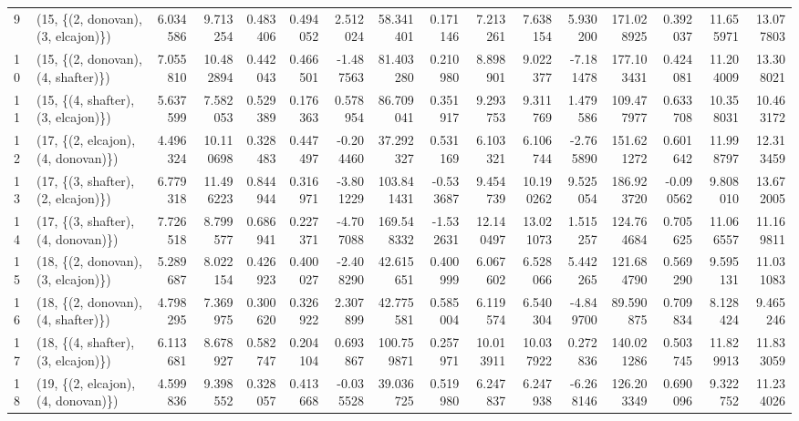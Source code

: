 \begin{tabular}{llrrrrrrrrrrrrrr}
9  &  (15, \{(2, donovan), (3, elcajon)\}) &  6.034586 &   9.713254 &   0.483406 &  0.494052 &  2.512024 &   58.341401 &  0.171146 &   7.213261 &   7.638154 &  5.930200 &  171.028925 &  0.392037 &  11.655971 &  13.077803 \\
10 &  (15, \{(2, donovan), (4, shafter)\}) &  7.055810 &  10.482894 &   0.442043 &  0.466501 & -1.487563 &   81.403280 &  0.210980 &   8.898901 &   9.022377 & -7.181478 &  177.103431 &  0.424081 &  11.204009 &  13.308021 \\
11 &  (15, \{(4, shafter), (3, elcajon)\}) &  5.637599 &   7.582053 &   0.529389 &  0.176363 &  0.578954 &   86.709041 &  0.351917 &   9.293753 &   9.311769 &  1.479586 &  109.477977 &  0.633708 &  10.358031 &  10.463172 \\
12 &  (17, \{(2, elcajon), (4, donovan)\}) &  4.496324 &  10.110698 &   0.328483 &  0.447497 & -0.204460 &   37.292327 &  0.531169 &   6.103321 &   6.106744 & -2.765890 &  151.621272 &  0.601642 &  11.998797 &  12.313459 \\
13 &  (17, \{(3, shafter), (2, elcajon)\}) &  6.779318 &  11.496223 &   0.844944 &  0.316971 & -3.801229 &  103.841431 & -0.533687 &   9.454739 &  10.190262 &  9.525054 &  186.923720 & -0.090562 &   9.808010 &  13.672005 \\
14 &  (17, \{(3, shafter), (4, donovan)\}) &  7.726518 &   8.799577 &   0.686941 &  0.227371 & -4.707088 &  169.548332 & -1.532631 &  12.140497 &  13.021073 &  1.515257 &  124.764684 &  0.705625 &  11.066557 &  11.169811 \\
15 &  (18, \{(2, donovan), (3, elcajon)\}) &  5.289687 &   8.022154 &   0.426923 &  0.400027 & -2.408290 &   42.615651 &  0.400999 &   6.067602 &   6.528066 &  5.442265 &  121.684790 &  0.569290 &   9.595131 &  11.031083 \\
16 &  (18, \{(2, donovan), (4, shafter)\}) &  4.798295 &   7.369975 &   0.300620 &  0.326922 &  2.307899 &   42.775581 &  0.585004 &   6.119574 &   6.540304 & -4.849700 &   89.590875 &  0.709834 &   8.128424 &   9.465246 \\
17 &  (18, \{(4, shafter), (3, elcajon)\}) &  6.113681 &   8.678927 &   0.582747 &  0.204104 &  0.693867 &  100.759871 &  0.257971 &  10.013911 &  10.037922 &  0.272836 &  140.021286 &  0.503745 &  11.829913 &  11.833059 \\
18 &  (19, \{(2, elcajon), (4, donovan)\}) &  4.599836 &   9.398552 &   0.328057 &  0.413668 & -0.035528 &   39.036725 &  0.519980 &   6.247837 &   6.247938 & -6.268146 &  126.203349 &  0.690096 &   9.322752 &  11.234026 \\

\end{tabular}
